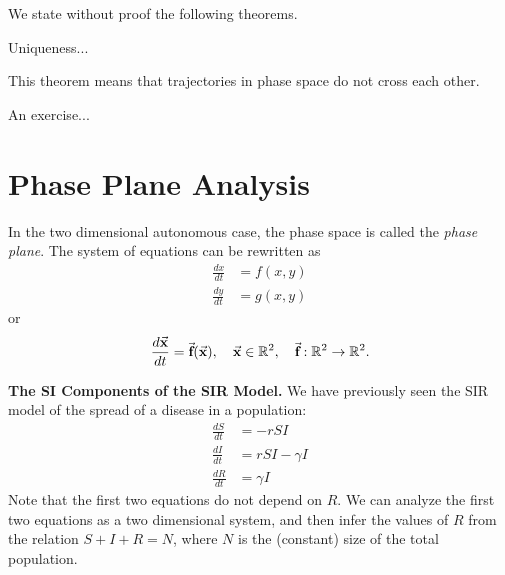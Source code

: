 We state without proof the following theorems.
\begin{theorem}
Uniqueness...
\end{theorem}
This theorem means that trajectories in phase
space do not cross each other.

\begin{exercises}
\begin{exercise}
An exercise...
\end{exercise}
\end{exercises}
%
\newpage
%
\section{Phase Plane Analysis}

In the two dimensional autonomous case, the phase space
is called the \emph{phase plane}.
The system of equations can be rewritten as
\begin{equation}
\begin{split}
    \frac{dx}{dt} & = f(x,y) \\
    \frac{dy}{dt} & = g(x,y)
\end{split}
\end{equation}
or
\begin{equation}
  \frac{d\vec{\textbf{x}}}{dt} = \vec{\textbf{f}}(\vec{\textbf{x}}), \quad \vec{\textbf{x}} \in \mathbb{R}^2, \quad
      \vec{\textbf{f}} : \mathbb{R}^2 \rightarrow \mathbb{R}^2.
\end{equation}
\begin{xexample}
\textbf{The SI Components of the SIR Model.}
We have previously seen the SIR model of the spread of
a disease in a population:
\begin{equation}
\begin{split}
   \frac{dS}{dt} & = -rSI \\
   \frac{dI}{dt} & = rSI -\gamma I \\
   \frac{dR}{dt} & = \gamma I
\end{split}
\end{equation}
Note that the first two equations do not depend on $R$.
We can analyze the first two equations as a two dimensional
system, and then infer the values of $R$ from the
relation $S+I+R=N$, where $N$ is the (constant) size
of the total population.
\end{xexample}


%

